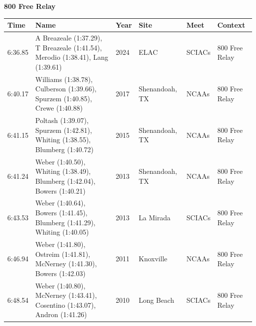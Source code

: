 \noindent\begin{minipage}[t]{0.98\textwidth}
\centering
\textbf{\textcolor{teamprimary}{800 Free Relay}}\par
\vspace{0.5em}
\centering
\small
\renewcommand{\arraystretch}{1.0}
\setlength{\tabcolsep}{4pt}
\begin{tabular}{@{}p{2.0cm}p{3.2cm}p{1.2cm}p{2.0cm}p{2.0cm}p{2.5cm}@{}}
\toprule
\textbf{Time} & \textbf{Name} & \textbf{Year} & \textbf{Site} & \textbf{Meet} & \textbf{Context} \\
\midrule
6:36.85 & A Breazeale (1:37.29), T Breazeale (1:41.54), Merodio (1:38.41), Lang (1:39.61) & 2024 & ELAC & SCIACs & 800 Free Relay \\
6:40.17 & Williams (1:38.78), Culberson (1:39.66), Spurzem (1:40.85), Crewe (1:40.88) & 2017 & Shenandoah, TX & NCAAs & 800 Free Relay \\
6:41.15 & Poltash (1:39.07), Spurzem (1:42.81), Whiting (1:38.55), Blumberg (1:40.72) & 2015 & Shenandoah, TX & NCAAs & 800 Free Relay \\
6:41.24 & Weber (1:40.50), Whiting (1:38.49), Blumberg (1:42.04), Bowers (1:40.21) & 2013 & Shenandoah, TX & NCAAs & 800 Free Relay \\
6:43.53 & Weber (1:40.64), Bowers (1:41.45), Blumberg (1:41.29), Whiting (1:40.05) & 2013 & La Mirada & SCIACs & 800 Free Relay \\
6:46.94 & Weber (1:41.80), Ostreim (1:41.81), McNerney (1:41.30), Bowers (1:42.03) & 2011 & Knoxville & NCAAs & 800 Free Relay \\
6:48.54 & Weber (1:40.80), McNerney (1:43.41), Cosentino (1:43.07), Andron (1:41.26) & 2010 & Long Beach & SCIACs & 800 Free Relay \\
\bottomrule
\end{tabular}
\end{minipage}
\vspace{1.2em}
